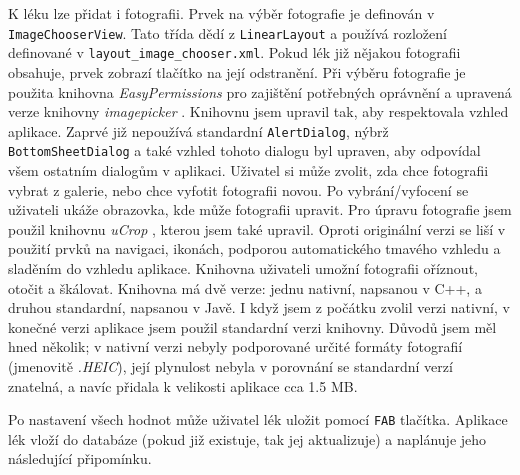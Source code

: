 \documentclass[../TakeYourPill.tex]{subfiles}
\begin{document}
K léku lze přidat i fotografii. Prvek na výběr fotografie je definován v \texttt{ImageChooserView}. Tato třída dědí z \texttt{LinearLayout} a používá rozložení definované v \texttt{layout\_image\_chooser.xml}. Pokud lék již nějakou fotografii obsahuje, prvek zobrazí tlačítko na její odstranění. Při výběru fotografie je použita knihovna \textit{EasyPermissions} \cite{easy-permissions} pro zajištění potřebných oprávnění a upravená verze knihovny \textit{imagepicker} \cite{imagepicker}. Knihovnu jsem upravil tak, aby respektovala vzhled aplikace. Zaprvé již nepoužívá standardní \texttt{AlertDialog}, nýbrž \texttt{BottomSheetDialog} a také vzhled tohoto dialogu byl upraven, aby odpovídal všem ostatním dialogům v aplikaci. Uživatel si může zvolit, zda chce fotografii vybrat z galerie, nebo chce vyfotit fotografii novou. Po vybrání/vyfocení se uživateli ukáže obrazovka, kde může fotografii upravit. Pro úpravu fotografie jsem použil knihovnu \textit{uCrop} \cite{ucrop}, kterou jsem také upravil. Oproti originální verzi se liší v použití prvků na navigaci, ikonách, podporou automatického tmavého vzhledu a sladěním do vzhledu aplikace. Knihovna uživateli umožní fotografii oříznout, otočit a škálovat. Knihovna má dvě verze: jednu nativní, napsanou v C++, a druhou standardní, napsanou v Javě. I když jsem z počátku zvolil verzi nativní, v konečné verzi aplikace jsem použil standardní verzi knihovny. Důvodů jsem měl hned několik; v nativní verzi nebyly podporované určité formáty fotografií (jmenovitě \textit{.HEIC}), její plynulost nebyla v porovnání se standardní verzí znatelná, a navíc přidala k velikosti aplikace cca 1.5 MB.

Po nastavení všech hodnot může uživatel lék uložit pomocí \texttt{FAB} tlačítka. Aplikace lék vloží do databáze (pokud již existuje, tak jej aktualizuje) a naplánuje jeho následující připomínku.

\end{document}
